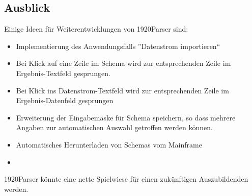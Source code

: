 \subsection{Ausblick}
\label{sec:Ausblick}
Einige Ideen für Weiterentwicklungen von 1920Parser sind:
\begin{itemize}
\item Implementierung des Anwendungsfalls ''Datenstrom importieren``
\item Bei Klick auf eine Zeile im Schema wird zur entsprechenden Zeile im Ergebnis-Textfeld gesprungen.
\item Bei Klick ins Datenstrom-Textfeld wird zur entsprechenden Zeile im Ergebnis-Datenfeld gesprungen
\item Erweiterung der Eingabemaske für Schema speichern, so dass mehrere Angaben zur automatischen Auswahl getroffen werden können.
\item Automatisches Herunterladen von Schemas vom Mainframe
\item 
\end{itemize}
1920Parser könnte eine nette Spielwiese für einen zukünftigen Auszubildenden werden.
